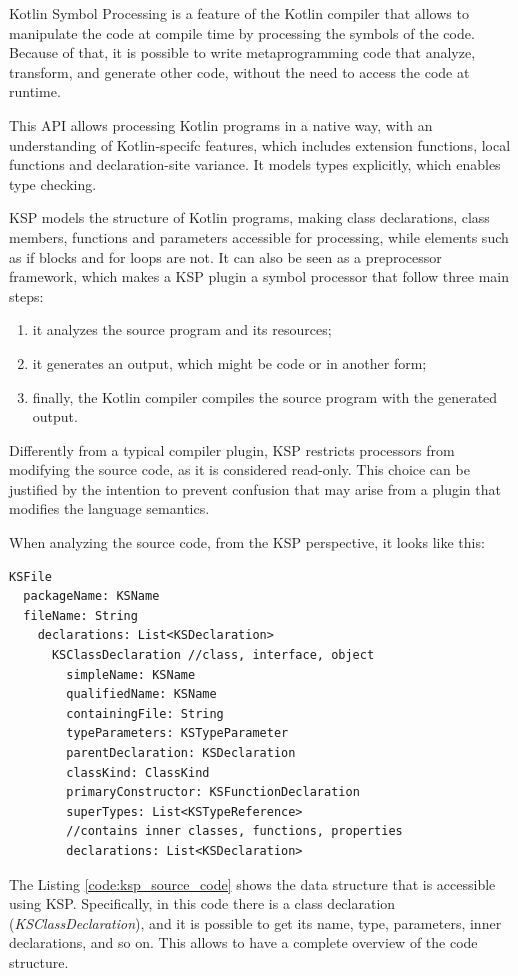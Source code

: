 Kotlin Symbol Processing is a feature of the Kotlin compiler that allows to manipulate the code at compile time by processing the symbols of the code. Because of that, it is possible to write metaprogramming code that analyze, transform, and generate other code, without the need to access the code at runtime.

This API allows processing Kotlin programs in a native way, with an understanding of Kotlin-specifc features, which includes extension functions, local functions and declaration-site variance. It models types explicitly, which enables type checking.

KSP models the structure of Kotlin programs, making class declarations, class members, functions and parameters accessible for processing, while elements such as if blocks and for loops are not.\newline
It can also be seen as a preprocessor framework, which makes a KSP plugin a symbol processor that follow three main steps:
\begin{enumerate}
    \item it analyzes the source program and its resources;
    \item it generates an output, which might be code or in another form;
    \item finally, the Kotlin compiler compiles the source program with the generated output.
\end{enumerate}

Differently from a typical compiler plugin, KSP restricts processors from modifying the source code, as it is considered read-only. This choice can be justified by the intention to prevent confusion that may arise from a plugin that modifies the language semantics.

When analyzing the source code, from the KSP perspective, it looks like this:
\begin{lstlisting}[caption={The source code from KSP perspective \cite{ksp_documentation}}, captionpos=b, label={code:ksp_source_code}]
KSFile
  packageName: KSName
  fileName: String
    declarations: List<KSDeclaration>
      KSClassDeclaration //class, interface, object
        simpleName: KSName
        qualifiedName: KSName
        containingFile: String
        typeParameters: KSTypeParameter
        parentDeclaration: KSDeclaration
        classKind: ClassKind
        primaryConstructor: KSFunctionDeclaration
        superTypes: List<KSTypeReference>
        //contains inner classes, functions, properties
        declarations: List<KSDeclaration>    
\end{lstlisting}
The Listing \ref{code:ksp_source_code} shows the data structure that is accessible using KSP. Specifically, in this code there is a class declaration (\textit{KSClassDeclaration}), and it is possible to get its name, type, parameters, inner declarations, and so on. This allows to have a complete overview of the code structure.

